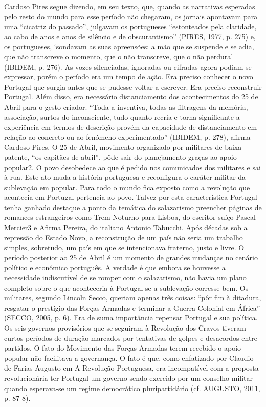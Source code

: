 \documentclass[../DISSERTACAO_MAIN.tex]{subfiles}
\begin{document}
Cardoso Pires segue dizendo, em seu texto, que, quando as narrativas esperadas pelo resto do mundo para esse período não chegaram, os jornais apontavam para uma “cicatriz do passado”, julgavam os portugueses “estonteados pela claridade, ao cabo de anos e anos de silêncio e de obscurantismo” (PIRES, 1977, p. 275) e, os portugueses, ‘sondavam as suas apreensões: a mão que se suspende e se adia, que não transcreve o momento, que o não transcreve, que o não perdura’ (IBIDEM, p. 276). As vozes silenciadas, ignoradas ou cifradas agora podiam se expressar, porém o período era um tempo de ação. Era preciso conhecer o novo Portugal que surgia antes que se pudesse voltar a escrever. Era preciso reconstruir Portugal. Além disso, era necessário distanciamento dos acontecimentos do 25 de Abril para o gesto criador. “Toda a inventiva, todas as filtragens da memória, associação, surtos do inconsciente, tudo quanto recria e torna significante a experiência em termos de descrição provém da capacidade de distanciamento em relação ao concreto ou ao fenómeno experimentado” (IBIDEM, p. 278), afirma Cardoso Pires. 
O 25 de Abril, movimento organizado por militares de baixa patente, “os capitães de abril”, pôde sair do planejamento graças ao apoio popular2. O povo desobedece ao que é pedido nos comunicados dos militares e sai à rua. Este ato muda a história portuguesa e reconfigura o caráter militar da sublevação em popular. Para todo o mundo fica exposto como a revolução que acontecia em Portugal pertencia ao povo. Talvez por esta característica Portugal tenha ganhado destaque a ponto da temática do salazarismo preencher páginas de romances estrangeiros como Trem Noturno para Lisboa, do escritor suíço Pascal Mercier3 e Afirma Pereira, do italiano Antonio Tabucchi. 
Após décadas sob a repressão do Estado Novo, a reconstrução de um país não seria um trabalho simples, sobretudo, um país em que se intencionava fraterno, justo e livre. O período posterior ao 25 de Abril é um momento de grandes mudanças no cenário político e econômico português. A verdade é que embora se houvesse a necessidade indiscutível de se romper com o salazarismo, não havia um plano completo sobre o que aconteceria à Portugal se a sublevação corresse bem. Os militares, segundo Lincoln Secco, queriam apenas três coisas: “pôr fim à ditadura, resgatar o prestígio das Forças Armadas e terminar a Guerra Colonial em África” (SECCO, 2005, p. 6). Era de suma importância repensar Portugal e sua política. Os seis governos provisórios que se seguiram à Revolução dos Cravos tiveram curtos períodos de duração marcados por tentativas de golpes e desacordos entre partidos. O fato do Movimento das Forças Armadas terem recebido o apoio  popular não facilitava a governança. O fato é que, como enfatizado por Claudio de Farias Augusto em A Revolução Portuguesa, era incompatível com a proposta revolucionária ter Portugal um governo sendo exercido por um conselho militar quando esperava-se um regime democrático pluripartidário (cf. AUGUSTO, 2011, p. 87-8). 
\end{document}
